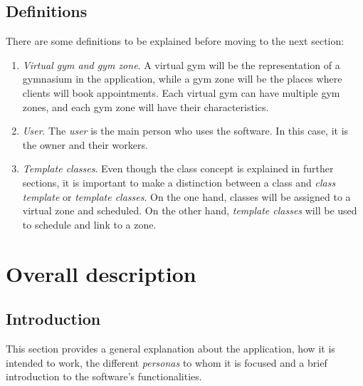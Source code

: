\documentclass[a4paper,12pt]{book}
\begin{document}
\subsection{Definitions}
There are some definitions to be explained before moving to the next section:
\begin{enumerate}[label = -]
	\item \emph{Virtual gym and gym zone}. A virtual gym will be the representation of a gymnasium in the application, while a gym zone will be the places where clients will book appointments. Each virtual gym can have multiple gym zones, and each gym zone will have their characteristics.
	\item \emph{User}. The \emph{user} is the main person who uses the software. In this case, it is the owner and their workers.
	\item \emph{Template classes}. Even though the class concept is explained in further sections, it is important to make a distinction between a class and \emph{class template} or \emph{template classes}. On the one hand, classes will be assigned to a virtual zone and scheduled. On the other hand, \emph{template classes} will be used to schedule and link to a zone. 
\end{enumerate}
\section{Overall description}
\subsection{Introduction}
This section provides a general explanation about the application, how it is intended to work, the different \emph{personas} to whom it is focused and a brief introduction to the software's functionalities.
\end{document}
